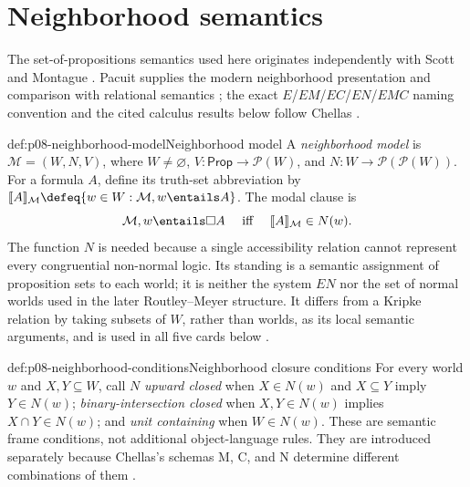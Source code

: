 \section{Neighborhood semantics}

The set-of-propositions semantics used here originates independently with
Scott and Montague \cite{Scott1970,Montague1970Pragmatics}. Pacuit supplies the modern
neighborhood presentation and comparison with relational semantics
\cite{Pacuit2017}; the exact \(E\)/\(EM\)/\(EC\)/\(EN\)/\(EMC\) naming
convention and the cited
calculus results below follow Chellas \cite{Chellas1980}.

\begin{hbdefinition}{def:p08-neighborhood-model}{Neighborhood model}
A \emph{neighborhood model} is
\(\mathcal M=(W,N,V)\), where \(W\ne\varnothing\),
\(V:\mathsf{Prop}\to\mathcal P(W)\), and
\(N:W\to\mathcal P(\mathcal P(W))\).  For a formula \(A\), define
its truth-set abbreviation by
\(\lbrack\!\lbrack A\rbrack\!\rbrack_{\mathcal M}
\defeq\{w\in W:\mathcal M,w\entails A\}\).  The modal clause is
\[
 \mathcal M,w\entails\Box A
 \quad\text{ iff }\quad
 \lbrack\!\lbrack A\rbrack\!\rbrack_{\mathcal M}\in N(w).
\]
The function \(N\) is needed because a single accessibility relation
cannot represent every congruential non-normal logic.  Its standing is a
semantic assignment of proposition sets to each world; it is neither the
system \(EN\) nor the set of normal worlds used in the later
Routley--Meyer structure.  It differs from a Kripke
relation by taking subsets of \(W\), rather than worlds, as its local semantic
arguments, and is used in all five cards below
\cite{Scott1970,Montague1970Pragmatics,Chellas1980,Pacuit2017}.
\end{hbdefinition}

\begin{hbdefinition}{def:p08-neighborhood-conditions}{Neighborhood closure conditions}
For every world \(w\) and \(X,Y\subseteq W\), call \(N\)
\emph{upward closed} when
\(X\in N(w)\) and \(X\subseteq Y\) imply
\(Y\in N(w)\); \emph{binary-intersection closed} when
\(X,Y\in N(w)\) implies
\(X\cap Y\in N(w)\); and \emph{unit containing} when
\(W\in N(w)\).  These are semantic frame conditions, not additional
object-language rules.  They are introduced separately because Chellas's
schemas M, C, and N determine different combinations of them
\cite{Chellas1980,Pacuit2017}.
\end{hbdefinition}

